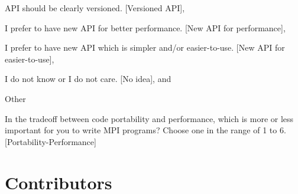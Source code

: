\documentclass[preprint,5p,times]{elsarticle}
\def\Countries{Contributors\xspace{}}%
\begin{document}
{{\begin{description}
\begin{inparaenum}[{\bf C}1)]
    \item API should be clearly versioned. [Versioned API],
    \item I prefer to have new API for better performance. [New API for performance],
    \item I prefer to have new API which is simpler and/or
      easier-to-use. [New API for easier-to-use],
    \item I do not know or I do not care. [No idea], and
    \item Other
    \end{inparaenum}
  \item[Q29:] In the tradeoff between code portability and performance,
    which is more or less important for you to write MPI programs?
    Choose one in the range of 1 to 6. [Portability-Performance]
  \end{description}
}

\section{\Countries}
\label{app:countries}

}
\end{document}
